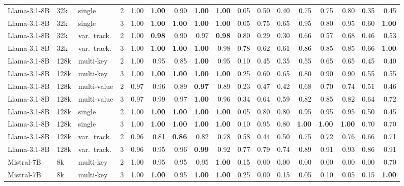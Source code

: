 \begin{tabular}{@{}llllrrrrrrrrrrrrr@{}}
Llama-3.1-8B & 32k & single & 2 & 1.00 & \textbf{1.00} & 0.90 & \textbf{1.00} & \textbf{1.00} & 0.05 & 0.50 & 0.40 & 0.75 & 0.75 & 0.80 & 0.35 & 0.45 \\
Llama-3.1-8B & 32k & single & 3 & 1.00 & \textbf{1.00} & \textbf{1.00} & \textbf{1.00} & \textbf{1.00} & 0.05 & 0.75 & 0.65 & 0.95 & 0.80 & 0.95 & 0.60 & \textbf{1.00} \\
Llama-3.1-8B & 32k & var.\ track. & 2 & 1.00 & \textbf{0.98} & 0.90 & 0.97 & \textbf{0.98} & 0.80 & 0.29 & 0.30 & 0.66 & 0.57 & 0.68 & 0.46 & 0.53 \\
Llama-3.1-8B & 32k & var.\ track. & 3 & 1.00 & \textbf{1.00} & \textbf{1.00} & \textbf{1.00} & 0.98 & 0.78 & 0.62 & 0.61 & 0.86 & 0.85 & 0.85 & 0.66 & \textbf{1.00} \\
\addlinespace[1pt]
Llama-3.1-8B & 128k & multi-key & 2 & 1.00 & 0.95 & 0.85 & \textbf{1.00} & 0.95 & 0.10 & 0.45 & 0.35 & 0.55 & 0.65 & 0.65 & 0.45 & 0.40 \\
Llama-3.1-8B & 128k & multi-key & 3 & 1.00 & \textbf{1.00} & \textbf{1.00} & \textbf{1.00} & \textbf{1.00} & 0.25 & 0.60 & 0.65 & 0.80 & 0.90 & 0.90 & 0.55 & 0.55 \\
Llama-3.1-8B & 128k & multi-value & 2 & 0.97 & 0.96 & 0.89 & \textbf{0.97} & 0.89 & 0.23 & 0.47 & 0.42 & 0.68 & 0.70 & 0.74 & 0.51 & 0.46 \\
Llama-3.1-8B & 128k & multi-value & 3 & 0.97 & 0.99 & 0.97 & \textbf{1.00} & 0.96 & 0.34 & 0.64 & 0.59 & 0.82 & 0.85 & 0.82 & 0.64 & 0.72 \\
Llama-3.1-8B & 128k & single & 2 & 1.00 & \textbf{1.00} & \textbf{1.00} & \textbf{1.00} & \textbf{1.00} & 0.05 & 0.80 & 0.80 & 0.95 & 0.95 & 0.95 & 0.50 & 0.45 \\
Llama-3.1-8B & 128k & single & 3 & 1.00 & \textbf{1.00} & \textbf{1.00} & \textbf{1.00} & \textbf{1.00} & 0.10 & 0.95 & 0.80 & \textbf{1.00} & \textbf{1.00} & \textbf{1.00} & 0.70 & 0.70 \\
Llama-3.1-8B & 128k & var.\ track. & 2 & 0.96 & 0.81 & \textbf{0.86} & 0.82 & 0.78 & 0.58 & 0.44 & 0.50 & 0.75 & 0.72 & 0.76 & 0.66 & 0.71 \\
Llama-3.1-8B & 128k & var.\ track. & 3 & 0.96 & 0.95 & 0.96 & \textbf{0.99} & 0.92 & 0.77 & 0.79 & 0.74 & 0.89 & 0.91 & 0.93 & 0.86 & 0.91 \\
\addlinespace[1pt]
Mistral-7B & 8k & multi-key & 2 & 1.00 & 0.95 & 0.95 & 0.95 & \textbf{1.00} & 0.15 & 0.00 & 0.00 & 0.00 & 0.00 & 0.00 & 0.00 & 0.70 \\
Mistral-7B & 8k & multi-key & 3 & 1.00 & \textbf{1.00} & 0.95 & \textbf{1.00} & \textbf{1.00} & 0.25 & 0.00 & 0.15 & 0.05 & 0.10 & 0.05 & 0.15 & \textbf{1.00} \\

\end{tabular}
